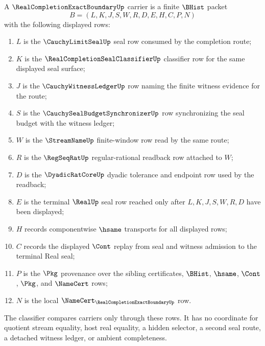 \begin{definition}
\label{def:real-completion-exact-boundary-carrier}
A $\RealCompletionExactBoundaryUp$ carrier is a finite $\BHist$ packet
$$
B=(L,K,J,S,W,R,D,E,H,C,P,N)
$$
with the following displayed rows:
\begin{enumerate}
\item $L$ is the $\CauchyLimitSealUp$ seal row consumed by the completion route;
\item $K$ is the $\RealCompletionSealClassifierUp$ classifier row for the same displayed seal surface;
\item $J$ is the $\CauchyWitnessLedgerUp$ row naming the finite witness evidence for the route;
\item $S$ is the $\CauchySealBudgetSynchronizerUp$ row synchronizing the seal budget with the witness ledger;
\item $W$ is the $\StreamNameUp$ finite-window row read by the same route;
\item $R$ is the $\RegSeqRatUp$ regular-rational readback row attached to $W$;
\item $D$ is the $\DyadicRatCoreUp$ dyadic tolerance and endpoint row used by the readback;
\item $E$ is the terminal $\RealUp$ seal row reached only after $L,K,J,S,W,R,D$ have been displayed;
\item $H$ records componentwise $\hsame$ transports for all displayed rows;
\item $C$ records the displayed $\Cont$ replay from seal and witness admission to the terminal Real seal;
\item $P$ is the $\Pkg$ provenance over the sibling certificates, $\BHist$, $\hsame$, $\Cont$, $\Pkg$, and $\NameCert$ rows;
\item $N$ is the local $\NameCert_{\RealCompletionExactBoundaryUp}$ row.
\end{enumerate}
The classifier compares carriers only through these rows. It has no coordinate for quotient stream equality, host real equality, a hidden selector, a second seal route, a detached witness ledger, or ambient completeness.
\end{definition}


